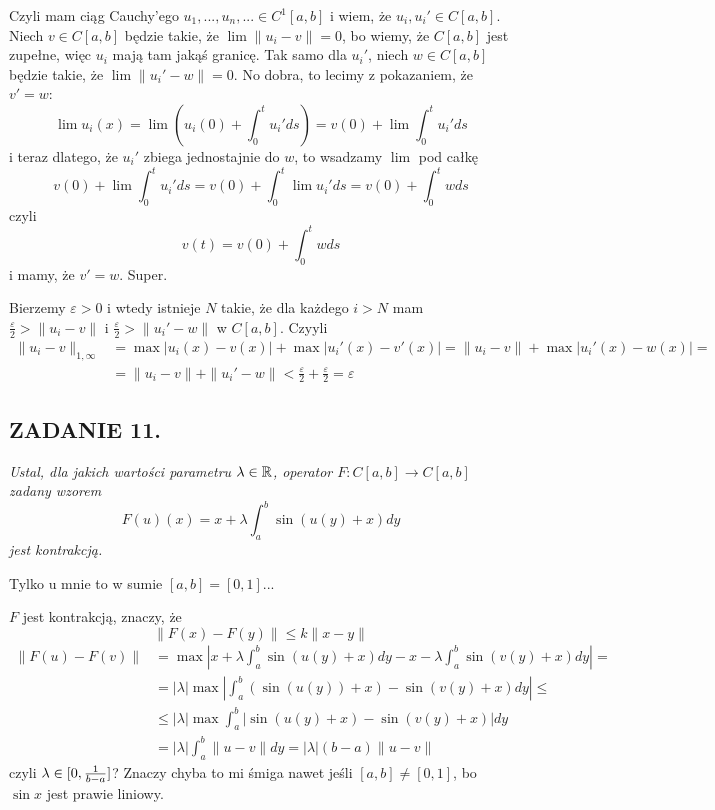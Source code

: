 \documentclass{article}
\begin{document}

Czyli mam ciąg Cauchy'ego $u_1,...,u_n,...\in C^1[a, b]$ i wiem, że $u_i,u_i'\in C[a, b]$. Niech $v\in C[a,b]$ będzie takie, że $\lim\|u_i-v\|=0$, bo wiemy, że $C[a,b]$ jest zupełne, więc $u_i$ mają tam jakąś granicę. Tak samo dla $u_i'$, niech $w\in C[a, b]$ będzie takie, że $\lim\|u_i'-w\|=0$. No dobra, to lecimy z pokazaniem, że $v'=w$:
$$\lim u_i(x)=\lim \left(u_i(0)+\int_0^tu_i'ds\right)=v(0)+\lim\int_0^tu_i'ds$$
i teraz dlatego, że $u_i'$ zbiega jednostajnie do $w$, to wsadzamy $\lim$ pod całkę
$$v(0)+\lim\int_0^tu_i'ds=v(0)+\int_0^t\lim u_i'ds=v(0)+\int_0^twds$$
czyli
$$v(t)=v(0)+\int_0^twds$$
i mamy, że $v'=w$. Super.

Bierzemy $\varepsilon>0$ i wtedy istnieje $N$ takie, że dla każdego $i>N$ mam $\frac\varepsilon2>\|u_i-v\|$ i $\frac\varepsilon2>\|u_i'-w\|$ w $C[a,b]$. Czyyli
\begin{align*}
    \|u_i-v\|_{1,\infty}&=\max|u_i(x)-v(x)|+\max|u_i'(x)-v'(x)|=\|u_i-v\|+\max|u_i'(x)-w(x)|=\\
    &=\|u_i-v\|+\|u_i'-w\|<\frac\varepsilon2+\frac\varepsilon2=\varepsilon
\end{align*}

\subsection*{ZADANIE 11.}
{\color{pink}\emph{Ustal, dla jakich wartości parametru $\lambda\in\mathbb{R}$, operator $F:C[a,b]\to C[a,b]$ zadany wzorem}
$$F(u)(x)=x+\lambda\int_a^b\sin(u(y)+x)dy$$
\emph{jest kontrakcją.}
}

Tylko u mnie to w sumie $[a, b]=[0, 1]$...

$F$ jest kontrakcją, znaczy, że
$$\|F(x)-F(y)\|\leq k\|x-y\|$$
\begin{align*}
    \|F(u)-F(v)\|&=\max\left|x+\lambda\int_a^b\sin(u(y)+x)dy-x-\lambda\int_a^b\sin(v(y)+x)dy\right|=\\
    &=|\lambda|\max\left|\int_a^b(\sin(u(y))+x)-\sin(v(y)+x)dy\right|\leq\\
    &\leq|\lambda|\max\int_a^b|\sin(u(y)+x)-\sin(v(y)+x)|dy\\
    &=|\lambda|\int_a^b\|u-v\|dy=|\lambda|(b-a)\|u-v\|
\end{align*}
czyli $\lambda\in[0, {1\over b-a}]$? Znaczy chyba to mi śmiga nawet jeśli $[a, b]\neq[0, 1]$, bo $\sin x$ jest prawie liniowy.
\end{document}
